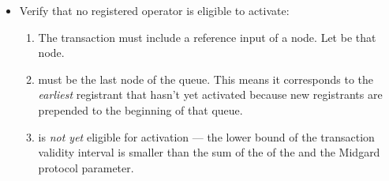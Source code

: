 \documentclass[../midgard.tex]{subfiles}
\begin{document}
\begin{description}
\begin{itemize}
            \item Verify that no registered operator is eligible to activate:
            \begin{enumerate}[resume]
                \item The transaction must include a reference input of a  node.
                  Let  be that node.
                \item {} must be the last node of the  queue.
                  This means it corresponds to the \emph{earliest} registrant that hasn't yet activated because new registrants are prepended to the beginning of that queue.
                \item {} is \emph{not yet} eligible for activation --- the lower bound of the transaction validity interval is smaller than the sum of the  of the  and the Midgard  protocol parameter.
            \end{enumerate}
        \end{itemize}
\end{description}
\end{document}
